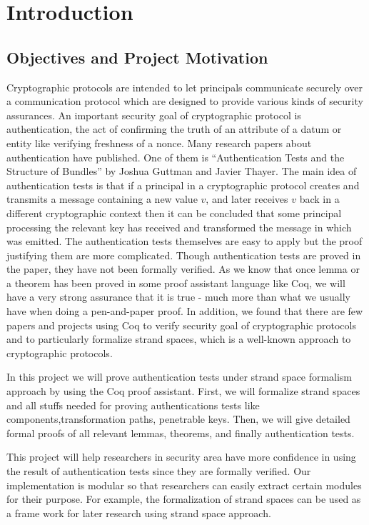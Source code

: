 \chapter{Introduction}
\section{Objectives and Project Motivation}
Cryptographic protocols are intended to let principals communicate
securely over a communication protocol which are designed to provide
various kinds of security assurances. An important security goal of
cryptographic protocol is authentication, the act of confirming the
truth of an attribute of a datum or entity like verifying freshness of
a nonce. Many research papers about authentication have published. One
of them is “Authentication Tests and the Structure of Bundles” by
Joshua Guttman and Javier Thayer. The main idea of authentication
tests is that if a principal in a cryptographic protocol creates and
transmits a message containing a new value $v$, and later receives $v$
back in a different cryptographic context then it can be concluded
that some principal processing the relevant key has received and
transformed the message in which  was emitted. The authentication
tests themselves are easy to apply but the proof justifying them are
more complicated. Though authentication tests are proved in the paper,
they have not been formally verified.  As we know that once lemma or a
theorem has been proved in some proof assistant language like Coq, we
will have a very strong assurance that it is true - much more than
what we usually have when doing a pen-and-paper proof. In addition, we found that there are few papers and projects using Coq to verify security goal of cryptographic protocols and to particularly formalize strand spaces, which is a well-known approach to cryptographic protocols.

In this project we will prove authentication tests under strand space formalism approach by using the Coq proof assistant. First, we will formalize strand spaces and all stuffs needed for proving authentications tests like components,transformation paths, penetrable keys. Then, we will give detailed formal proofs of all relevant lemmas, theorems, and finally authentication tests.

This project will help researchers in security area have more
confidence in using the result of authentication tests since they are
formally verified. Our implementation is modular so that researchers
can easily extract certain modules for their purpose. For example, the
formalization of strand spaces can be used as a frame work for later
research using strand space approach.

